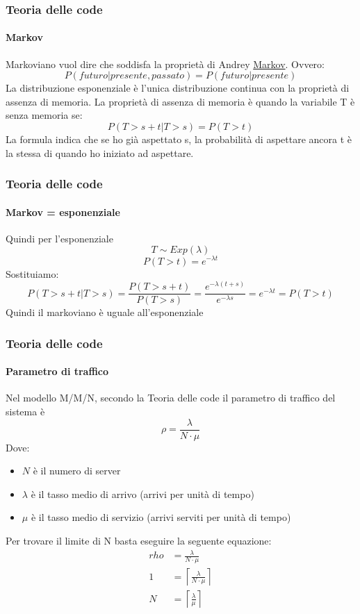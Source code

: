 \documentclass{beamer}
\begin{document}
\begin{frame}
    \frametitle{Teoria delle code}
    \framesubtitle{Markov}
    Markoviano vuol dire che soddisfa la proprietà di Andrey \underline{Markov}. Ovvero:
    \[
    P(futuro|presente,passato)=P(futuro|presente)
    \]
    La distribuzione esponenziale è l'unica distribuzione continua con la proprietà di assenza di memoria.
    La proprietà di assenza di memoria è quando la variabile T è senza memoria se:
    \[P(T>s+t|T>s)=P(T>t)
    \] 
    La formula indica che se ho già aspettato s, la probabilità di aspettare ancora t è la stessa di quando ho iniziato ad aspettare.
\end{frame}


\begin{frame}
    \frametitle{Teoria delle code}
    \framesubtitle{Markov = esponenziale}
    Quindi per l'esponenziale
    \[T\sim Exp(\lambda)\]
    \[P(T>t)=e^{-\lambda t}\]
    Sostituiamo:
    \[P(T>s+t|T>s)=\frac{P(T>s+t)}{P(T>s)}=\frac{e^{-\lambda(t+s)}}{e^{-\lambda s}}=e^{-\lambda t}=P(T>t)\]
    Quindi il markoviano è uguale all'esponenziale
\end{frame}

\begin{frame}
    \frametitle{Teoria delle code}
    \framesubtitle{Parametro di traffico}
    Nel modello M/M/N, secondo la Teoria delle code il parametro di traffico del sistema è
    \[\rho=\frac{\lambda}{N\cdot \mu}\]
    Dove:
    \begin{itemize}
        \item $N$ è il numero di server
        \item $\lambda$ è il tasso medio di arrivo (arrivi per unità di tempo)
        \item $\mu$ è il tasso medio di servizio (arrivi serviti per unità di tempo)
    \end{itemize}

    Per trovare il limite di N basta eseguire la seguente equazione:
    \begin{align}
        rho&=\frac{\lambda}{N\cdot \mu}\\
        1&=\left \lceil \frac{\lambda}{N\cdot \mu} \right \rceil\\
        N&=\left \lceil \frac{\lambda}{\mu} \right \rceil
    \end{align}

\end{frame}
\end{document}
